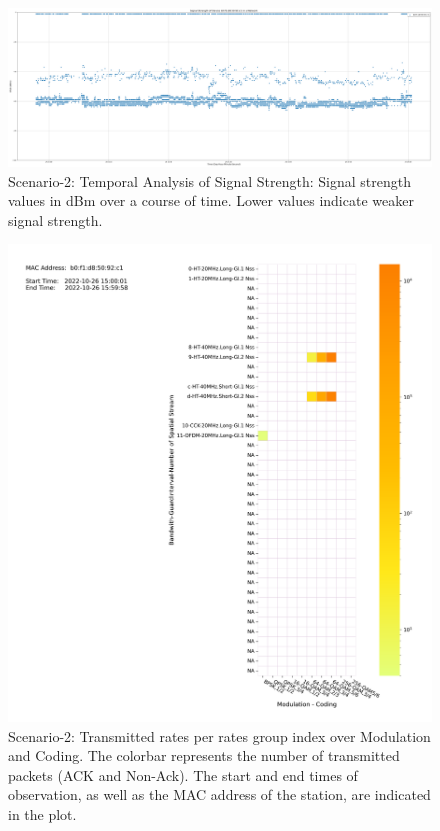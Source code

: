\begin{landscape}
\begin{figure}[hbt!]
  \centering
  \includegraphics[width=1.45\textwidth, height=\textheight, keepaspectratio]{figures/plots/Scenario-2/G2-RSSI-b0:f1:d8:50:92:c1.png}
  \caption[Temporal Analysis of Signal Strength]{Scenario-2: Temporal Analysis of Signal Strength: Signal strength values in dBm over a course of time. Lower values indicate weaker signal strength.}
  \label{fig:rxs-2}
\end{figure}
\FloatBarrier 
\end{landscape}


\begin{figure}[hbt!]
  \centering
  \includegraphics[width=\textwidth]{figures/plots/Scenario-2/G2-attemptmap-b0:f1:d8:50:92:c1-22-431070-450182.png}
  \caption[Transmission Status]{Scenario-2: Transmitted rates per rates group index over Modulation and Coding. The colorbar represents the number of transmitted packets (ACK and Non-Ack). The start and end times of observation, as well as the MAC address of the station, are indicated in the plot.}
  \label{fig:Attempt2}
\end{figure}
\FloatBarrier 


